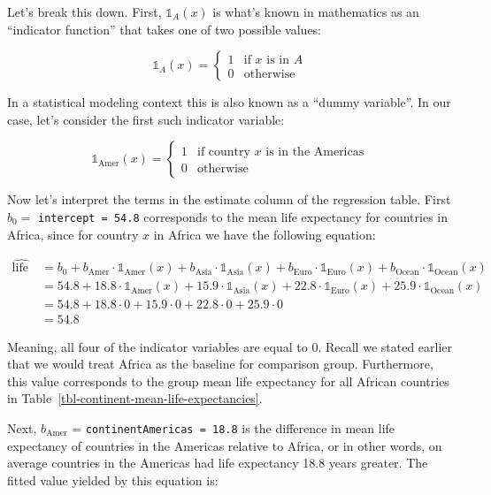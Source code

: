 \documentclass[
  letterpaper,
  DIV=11,
  numbers=noendperiod]{scrreprt}
\theoremstyle{definition}
\theoremstyle{remark}
\begin{document}
Let's break this down. First, \(\mathbb{1}_{A}(x)\) is what's known in
mathematics as an ``indicator function'' that takes one of two possible
values:

\[
\mathbb{1}_{A}(x) = \left\{
\begin{array}{ll}
1 & \text{if } x \text{ is in } A \\
0 & \text{otherwise} \end{array}
\right.
\]

In a statistical modeling context this is also known as a ``dummy
variable''. In our case, let's consider the first such indicator
variable:

\[
\mathbb{1}_{\mbox{Amer}}(x) = \left\{
\begin{array}{ll}
1 & \text{if } \text{country } x \text{ is in the Americas} \\
0 & \text{otherwise}\end{array}
\right.
\]

Now let's interpret the terms in the estimate column of the regression
table. First \(b_0 =\) \texttt{intercept\ =\ 54.8} corresponds to the
mean life expectancy for countries in Africa, since for country \(x\) in
Africa we have the following equation:

\[
\begin{aligned}
\widehat{\text{life exp}} &= b_0 + b_{\text{Amer}}\cdot\mathbb{1}_{\mbox{Amer}}(x) + b_{\text{Asia}}\cdot\mathbb{1}_{\mbox{Asia}}(x)
+ b_{\text{Euro}}\cdot\mathbb{1}_{\mbox{Euro}}(x) + b_{\text{Ocean}}\cdot\mathbb{1}_{\mbox{Ocean}}(x)\\
&= 54.8 + 18.8\cdot\mathbb{1}_{\mbox{Amer}}(x) + 15.9\cdot\mathbb{1}_{\mbox{Asia}}(x)
+ 22.8\cdot\mathbb{1}_{\mbox{Euro}}(x) + 25.9\cdot\mathbb{1}_{\mbox{Ocean}}(x)\\
&= 54.8 + 18.8\cdot 0 + 15.9\cdot 0 + 22.8\cdot 0 + 25.9\cdot 0\\
&= 54.8
\end{aligned}
\]

Meaning, all four of the indicator variables are equal to 0. Recall we
stated earlier that we would treat Africa as the baseline for comparison
group. Furthermore, this value corresponds to the group mean life
expectancy for all African countries in
Table~\ref{tbl-continent-mean-life-expectancies}.

Next, \(b_{\text{Amer}}\) = \texttt{continentAmericas\ =\ 18.8} is the
difference in mean life expectancy of countries in the Americas relative
to Africa, or in other words, on average countries in the Americas had
life expectancy 18.8 years greater. The fitted value yielded by this
equation is:
\end{document}
